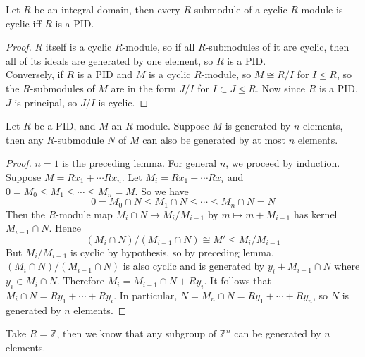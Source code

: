 \begin{lemma}
    Let $R$ be an integral domain, then every $R$-submodule of a cyclic $R$-module is cyclic iff $R$ is a PID.
\end{lemma}
\begin{proof}
    $R$ itself is a cyclic $R$-module, so if all $R$-submodules of it are cyclic, then all of its ideals are generated by one element, so $R$ is a PID.\\
    Conversely, if $R$ is a PID and $M$ is a cyclic $R$-module, so $M\cong R/I$ for $I\unlhd R$, so the $R$-submodules of $M$ are in the form $J/I$ for $I\subset J\unlhd R$.
    Now since $R$ is a PID, $J$ is principal, so $J/I$ is cyclic.
\end{proof}
\begin{theorem}
    Let $R$ be a PID, and $M$ an $R$-module.
    Suppose $M$ is generated by $n$ elements, then any $R$-submodule $N$ of $M$ can also be generated by at most $n$ elements.
\end{theorem}
\begin{proof}
    $n=1$ is the preceding lemma.
    For general $n$, we proceed by induction.
    Suppose $M=Rx_1+\cdots Rx_n$.
    Let $M_i=Rx_1+\cdots Rx_i$ and $0=M_0\le M_1\le\cdots\le M_n=M$.
    So we have
    $$0=M_0\cap N\le M_1\cap N\le\cdots\le M_n\cap N=N$$
    Then the $R$-module map $M_i\cap N\to M_i/M_{i-1}$ by $m\mapsto m+M_{i-1}$ has kernel $M_{i-1}\cap N$.
    Hence
    $$(M_i\cap N)/(M_{i-1}\cap N)\cong M'\le M_i/M_{i-1}$$
    But $M_i/M_{i-1}$ is cyclic by hypothesis, so by preceding lemma, $(M_i\cap N)/(M_{i-1}\cap N)$ is also cyclic and is generated by $y_i+M_{i-1}\cap N$ where $y_i\in M_i\cap N$.
    Therefore $M_i=M_{i-1}\cap N+Ry_i$.
    It follows that $M_i\cap N=Ry_1+\cdots +Ry_i$.
    In particular, $N=M_n\cap N=Ry_1+\cdots+Ry_n$, so $N$ is generated by $n$ elements.
\end{proof}
\begin{example}
    Take $R=\mathbb Z$, then we know that any subgroup of $\mathbb Z^n$ can be generated by $n$ elements.
\end{example}